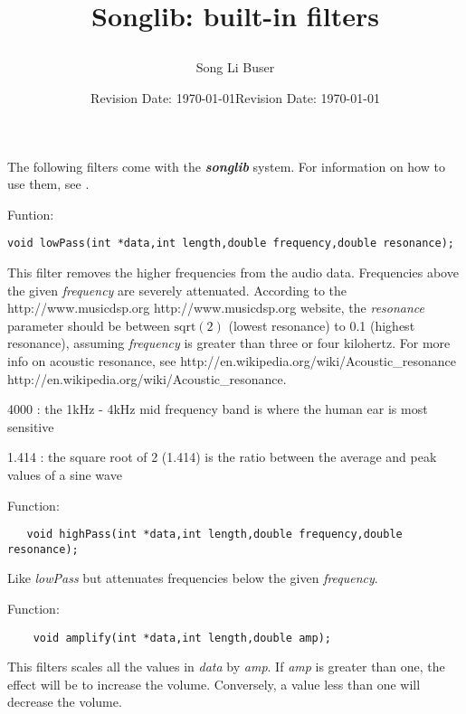 \documentclass{article}
\title{Songlib: built-in filters
\date{Revision Date: \today}}
\author{Song Li Buser}
\date{Revision Date: \today}
\begin{document}
\maketitle

\W\subsubsection*{}
\W\htmlrule

The following filters come with the {\it\bf songlib} system. For information
on how to use them, see
.

\htmlrule

Funtion: 

\begin{verbatim}
void lowPass(int *data,int length,double frequency,double resonance);
\end{verbatim}

This filter removes the higher frequencies from the audio data.
Frequencies above the given \emph{frequency} are severely attenuated.
According to the
\xlink
{http://www.musicdsp.org}
{http://www.musicdsp.org}
website, the \emph{resonance}
parameter should be between $\mathrm{sqrt}(2)$ (lowest resonance)
to 0.1 (highest resonance),
assuming \emph{frequency} is greater than three or four
kilohertz. For more info on acoustic resonance, see
\xlink
{http://en.wikipedia.org/wiki/Acoustic\_resonance}
{http://en.wikipedia.org/wiki/Acoustic\_resonance}.

4000 : the 1kHz - 4kHz mid frequency band is where the human ear is most
sensitive

1.414 : the square root of 2 (1.414) is the ratio between the average and
peak values of a sine wave

\htmlrule

Function:

\begin{verbatim}
   void highPass(int *data,int length,double frequency,double resonance);
\end{verbatim}

Like \emph{lowPass} but attenuates frequencies below the given \emph{frequency}.

\htmlrule

Function:

\begin{verbatim}
    void amplify(int *data,int length,double amp);
\end{verbatim}

This filters scales all the values in \emph{data} by \emph{amp}. If \emph{amp}
is greater than one, the effect will be to increase the volume.
Conversely, a value less than one will decrease the volume.
\end{document}
